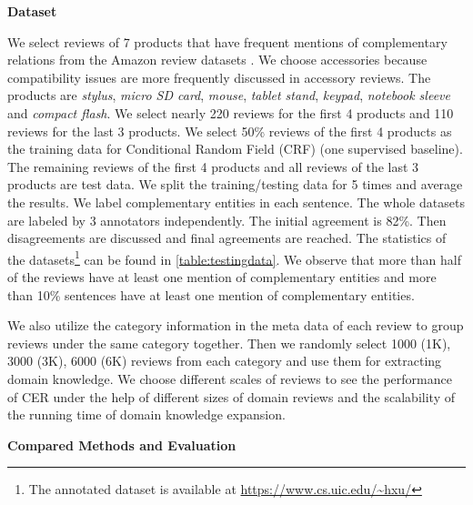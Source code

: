 \textbf{Dataset}

We select reviews of 7 products that have frequent mentions of complementary relations from the Amazon review datasets \cite{McAPanLes15}. We choose accessories because compatibility issues are more frequently discussed in accessory reviews. The products are \textit{stylus}, \textit{micro SD card}, \textit{mouse}, \textit{tablet stand}, \textit{keypad}, \textit{notebook sleeve} and \textit{compact flash}. We select nearly 220 reviews for the first 4 products and 110 reviews for the last 3 products. We select 50\% reviews of the first 4 products as the training data for Conditional Random Field (CRF) (one supervised baseline). The remaining reviews of the first 4 products and all reviews of the last 3 products are test data. We split the training/testing data for 5 times and average the results. We label complementary entities in each sentence. The whole datasets are labeled by 3 annotators independently. The initial agreement is 82\%. Then disagreements are discussed and final agreements are reached. The statistics of the datasets\footnote{The annotated dataset is available at \url{https://www.cs.uic.edu/~hxu/} } can be found in \ref{table:testingdata}. We observe that more than half of the reviews have at least one mention of complementary entities and more than 10\% sentences have at least one mention of complementary entities.

We also utilize the category information in the meta data of each review to group reviews under the same category together. Then we randomly select 1000 (1K), 3000 (3K), 6000 (6K) reviews from each category and use them for extracting domain knowledge. We choose different scales of reviews to see the performance of CER under the help of different sizes of domain reviews and the scalability of the running time of domain knowledge expansion.

\textbf{Compared Methods and Evaluation}

